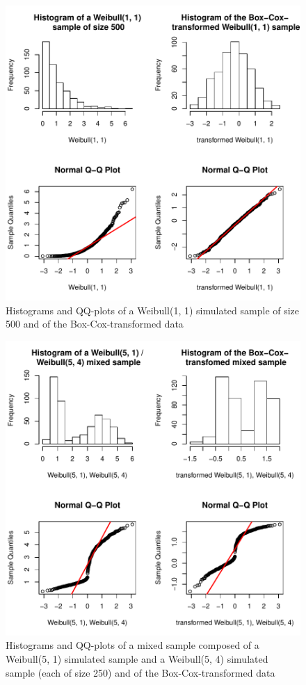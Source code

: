 \documentclass[a4paper, 12pt, titlepage, headsepline, listof = totoc, bibliography = totoc, numbers = noenddot]{scrartcl}
\begin{document}
\begin{figure}[h!]
\includegraphics[width=\textwidth]{report-transformationUnimodal}
\caption{Histograms and QQ-plots of a Weibull(1, 1) simulated sample of size 500 and of the Box-Cox-transformed data}
\label{fig:transformationUnimodal}
\end{figure}

\vfill

\newpage
\phantom{.}
\vfill

\begin{figure}[h!]
\includegraphics[width=\textwidth]{report-transformationBimodal}
\caption{Histograms and QQ-plots of a mixed sample composed of a Weibull(5, 1) simulated sample and a Weibull(5, 4) simulated sample (each of size 250) and of the Box-Cox-transformed data}
\label{fig:transformationBimodal}
\end{figure}
\end{document}
